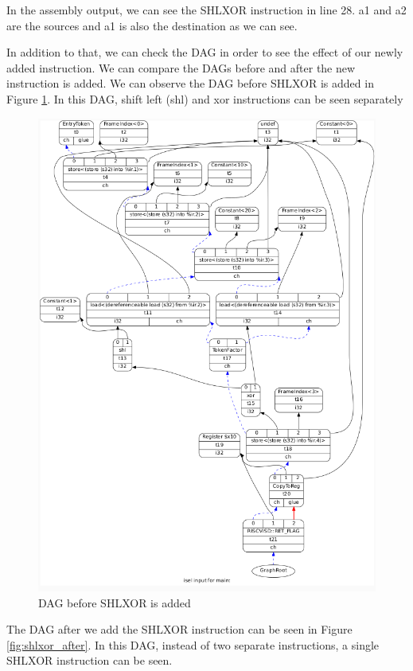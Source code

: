 In the assembly output, we can see the SHLXOR instruction in line 28. a1 and a2 are the sources and a1 is also the destination as we can see.

In addition to that, we can check the DAG in order to see the effect of our newly added instruction. We can compare the DAGs before and after the new instruction is added. We can observe the DAG before SHLXOR is added in Figure \ref{fig:shlxor_before}. In this DAG, shift left (shl) and xor instructions can be seen separately

\begin{figure}[h!]
    \centering
    \includegraphics[scale= 0.3]{adding_new_instr/shlxor_before.png}
    \caption{DAG before SHLXOR is added}
    \label{fig:shlxor_before}
\end{figure}

The DAG after we add the SHLXOR instruction can be seen in Figure \ref{fig:shlxor_after}. In this DAG, instead of two separate instructions, a single SHLXOR instruction can be seen.

